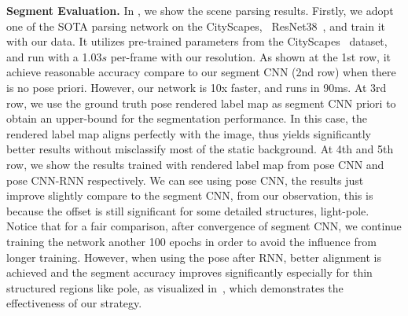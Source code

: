 \textbf{Segment Evaluation.}
In , we show the scene parsing results. 
Firstly, we adopt one of the SOTA parsing network on the CityScapes, \ie~ResNet38~\cite{WuSH16e}, and train it with our data. It utilizes pre-trained parameters from the CityScapes~\cite{Cordts2016Cityscapes} dataset, and run with a 1.03$s$ per-frame with our resolution. As shown at the 1st row, it achieve reasonable accuracy compare to our segment CNN (2nd row) when there is no pose priori. However, our network is 10x faster, and runs in 90ms. 
At 3rd row, we use the ground truth pose rendered label map as segment CNN priori to obtain an upper-bound for the segmentation performance. 
In this case, the rendered label map aligns perfectly with the image, thus yields significantly better results without misclassify most of the static background.
At 4th and 5th row, we show the results trained with rendered label map from pose CNN and pose CNN-RNN respectively. We can see using pose CNN, the results just improve slightly compare to the segment CNN, from our observation, this is because the offset is still significant for some detailed structures, \eg light-pole.
Notice that for a fair comparison, after convergence of segment CNN, we continue training the network another 100 epochs in order to avoid the influence from longer training.
However, when using the pose after RNN, better alignment is achieved and the segment accuracy improves significantly especially for thin structured regions like pole, as visualized in~, which demonstrates the effectiveness of our strategy. 

